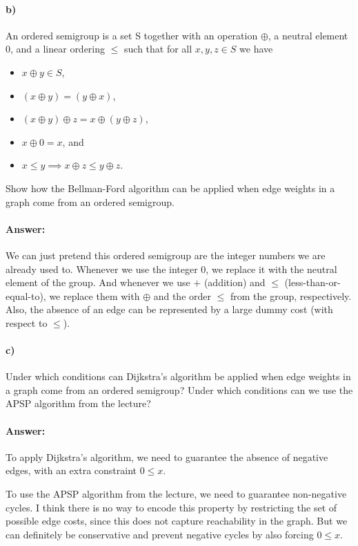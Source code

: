 \documentclass[a4paper]{article}
\begin{document}
\paragraph{b)} An ordered semigroup is a set S together with an operation $\oplus$, a neutral element 0, and a linear ordering $\le$ such that for all $x, y, z \in S$ we have
\begin{itemize}
\item $x \oplus y \in S$,
\item $(x \oplus y)=(y \oplus x)$,
\item $(x \oplus y) \oplus z=x \oplus (y \oplus z)$,
\item $x \oplus 0=x$, and
\item $x \le y \implies x \oplus z \le y \oplus z$.
\end{itemize}

Show how the Bellman-Ford algorithm can be applied when edge weights in a graph come from an ordered semigroup.

\paragraph{Answer:}

We can just pretend this ordered semigroup are the integer numbers we are already used to. Whenever we use the integer $0$, we replace it with the neutral element of the group. And whenever we use $+$ (addition) and $\le$ (less-than-or-equal-to), we replace them with $\oplus$ and the order $\le$ from the group, respectively. Also, the absence of an edge can be represented by a large dummy cost (with respect to $\le$).

\paragraph{c)} Under which conditions can Dijkstra’s algorithm be applied when edge weights in a graph come from an ordered semigroup? Under which conditions can we use the APSP algorithm from the lecture?

\paragraph{Answer:}

To apply Dijkstra's algorithm, we need to guarantee the absence of negative edges, with an extra constraint $0 \le x$.

To use the APSP algorithm from the lecture, we need to guarantee non-negative cycles.
I think there is no way to encode this property by restricting the set of possible edge costs, since this does not capture reachability in the graph. But we can definitely be conservative and prevent negative cycles by also forcing $0 \le x$.
\end{document}
